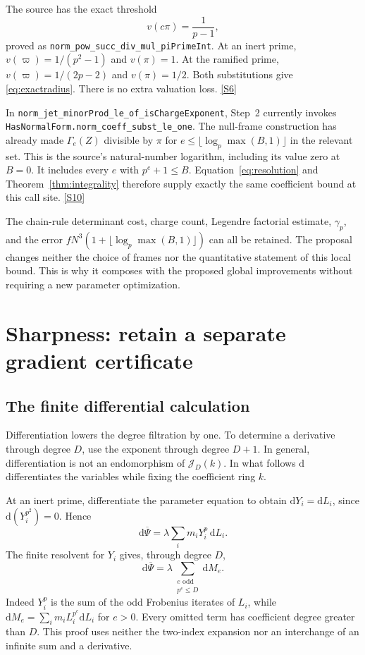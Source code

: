 \documentclass[11pt,letterpaper]{article}
\theoremstyle{remark}
\newcommand{\JJ}{\mathcal J}
\newcommand{\dd}{\mathrm d}
\newcommand{\code}[1]{{\small\nolinkurl{#1}}}
\newcommand{\src}[1]{\hyperref[src:#1]{[S#1]}}
\begin{document}
The source has the exact threshold
\begin{equation}
 v(c\pi)=\frac1{p-1}, \label{eq:exactradius}
\end{equation}
proved as \code{norm_pow_succ_div_mul_piPrimeInt}. At an inert prime,
\(v(\varpi)=1/(p^2-1)\) and \(v(\pi)=1\). At the ramified prime,
\(v(\varpi)=1/(2p-2)\) and \(v(\pi)=1/2\). Both substitutions give
\eqref{eq:exactradius}. There is no extra valuation loss. \src{6}

In \code{norm_jet_minorProd_le_of_isChargeExponent}, Step~2 currently invokes
\code{HasNormalForm.norm_coeff_subst_le_one}. The null-frame construction has
already made \(\Gamma_e(Z)\) divisible by \(\pi\) for
\(e\le\lfloor\log_p\max(B,1)\rfloor\) in the relevant set. This is the source's
natural-number logarithm, including its value zero at \(B=0\). It includes every
\(e\) with \(p^e+1\le B\). Equation~\eqref{eq:resolution} and
Theorem~\ref{thm:integrality} therefore supply exactly the same coefficient
bound at this call site. \src{10}

The chain-rule determinant cost, charge count, Legendre factorial estimate,
\(\gamma_p\), and the error
\(fN^3(1+\lfloor\log_p\max(B,1)\rfloor)\) can all be retained. The proposal
changes neither the choice of frames nor the quantitative statement of this
local bound. This is why it composes with the proposed global improvements
without requiring a new parameter optimization.

\section{Sharpness: retain a separate gradient certificate}
\label{sec:sharp}

\subsection{The finite differential calculation}

Differentiation lowers the degree filtration by one. To determine a derivative
through degree \(D\), use the exponent through degree \(D+1\). In general,
differentiation is not an endomorphism of \(\JJ_D(k)\). In what follows
\(\dd\) differentiates the variables while fixing the coefficient ring \(k\).

At an inert prime, differentiate the parameter equation to obtain
\(\dd Y_i=\dd L_i\), since \(\dd(Y_i^{p^2})=0\). Hence
\[
 \dd\overline\Psi
 =\lambda\sum_i m_iY_i^p\,\dd L_i.
\]
The finite resolvent for \(Y_i\) gives, through degree \(D\),
\begin{equation}
 \dd\overline\Psi
 =\lambda\sum_{\substack{e\text{ odd}\\p^e\le D}}\dd M_e.
 \label{eq:gradient}
\end{equation}
Indeed \(Y_i^p\) is the sum of the odd Frobenius iterates of \(L_i\), while
\(\dd M_e=\sum_i m_iL_i^{p^e}\dd L_i\) for \(e>0\). Every omitted term
has coefficient degree greater than \(D\). This proof uses neither the
two-index expansion nor an interchange of an infinite sum and a derivative.
\end{document}
